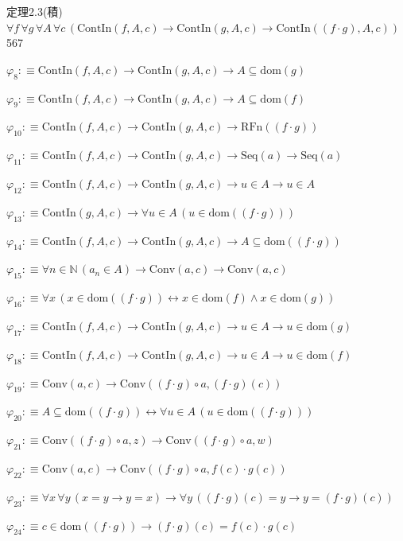 \begin{fullproof}{定理2.3(積)}{$\forall f\,\forall g\,\forall A\,\forall c\,(\mathrm{ContIn}(f,A,c) \to \mathrm{ContIn}(g,A,c) \to \mathrm{ContIn}((f \cdot g),A,c))$}{567}
\begin{abbrevlist}
\item $\varphi_{8} :\equiv \mathrm{ContIn}(f,A,c) \to \mathrm{ContIn}(g,A,c) \to A \subseteq \mathrm{dom}(g)$
\item $\varphi_{9} :\equiv \mathrm{ContIn}(f,A,c) \to \mathrm{ContIn}(g,A,c) \to A \subseteq \mathrm{dom}(f)$
\item $\varphi_{10} :\equiv \mathrm{ContIn}(f,A,c) \to \mathrm{ContIn}(g,A,c) \to \mathrm{RFn}((f \cdot g))$
\item $\varphi_{11} :\equiv \mathrm{ContIn}(f,A,c) \to \mathrm{ContIn}(g,A,c) \to \mathrm{Seq}(a) \to \mathrm{Seq}(a)$
\item $\varphi_{12} :\equiv \mathrm{ContIn}(f,A,c) \to \mathrm{ContIn}(g,A,c) \to u \in A \to u \in A$
\item $\varphi_{13} :\equiv \mathrm{ContIn}(g,A,c) \to \forall u \in A\,(u \in \mathrm{dom}((f \cdot g)))$
\item $\varphi_{14} :\equiv \mathrm{ContIn}(f,A,c) \to \mathrm{ContIn}(g,A,c) \to A \subseteq \mathrm{dom}((f \cdot g))$
\item $\varphi_{15} :\equiv \forall n \in \mathbb{N}\,(a_{n} \in A) \to \mathrm{Conv}(a,c) \to \mathrm{Conv}(a,c)$
\item $\varphi_{16} :\equiv \forall x\,(x \in \mathrm{dom}((f \cdot g)) \leftrightarrow x \in \mathrm{dom}(f) \land x \in \mathrm{dom}(g))$
\item $\varphi_{17} :\equiv \mathrm{ContIn}(f,A,c) \to \mathrm{ContIn}(g,A,c) \to u \in A \to u \in \mathrm{dom}(g)$
\item $\varphi_{18} :\equiv \mathrm{ContIn}(f,A,c) \to \mathrm{ContIn}(g,A,c) \to u \in A \to u \in \mathrm{dom}(f)$
\item $\varphi_{19} :\equiv \mathrm{Conv}(a,c) \to \mathrm{Conv}((f \cdot g) \circ a,(f \cdot g)(c))$
\item $\varphi_{20} :\equiv A \subseteq \mathrm{dom}((f \cdot g)) \leftrightarrow \forall u \in A\,(u \in \mathrm{dom}((f \cdot g)))$
\item $\varphi_{21} :\equiv \mathrm{Conv}((f \cdot g) \circ a,z) \to \mathrm{Conv}((f \cdot g) \circ a,w)$
\item $\varphi_{22} :\equiv \mathrm{Conv}(a,c) \to \mathrm{Conv}((f \cdot g) \circ a,f(c) \cdot g(c))$
\item $\varphi_{23} :\equiv \forall x\,\forall y\,(x = y \to y = x) \to \forall y\,((f \cdot g)(c) = y \to y = (f \cdot g)(c))$
\item $\varphi_{24} :\equiv c \in \mathrm{dom}((f \cdot g)) \to (f \cdot g)(c) = f(c) \cdot g(c)$

\end{abbrevlist}
\end{fullproof}
